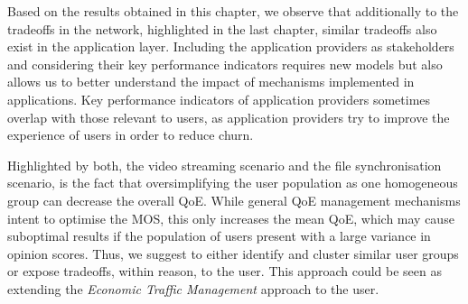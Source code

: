 Based on the results obtained in this chapter, we observe that additionally to the tradeoffs in the network, highlighted in the last chapter, similar tradeoffs also exist in the application layer.
Including the application providers as stakeholders and considering their key performance indicators requires new models but also allows us to better understand the impact of mechanisms implemented in applications.
Key performance indicators of application providers sometimes overlap with those relevant to users, as application providers try to improve the experience of users in order to reduce churn.

Highlighted by both, the video streaming scenario and the file synchronisation scenario, is the fact that oversimplifying the user population as one homogeneous group can decrease the overall \gls{QoE}.
While general \gls{QoE} management mechanisms intent to optimise the \gls{MOS}, this only increases the mean \gls{QoE}, which may cause suboptimal results if the population of users present with a large variance in opinion scores.
Thus, we suggest to either identify and cluster similar user groups or expose tradeoffs, within reason, to the user.
This approach could be seen as extending the \emph{Economic Traffic Management} approach to the user.